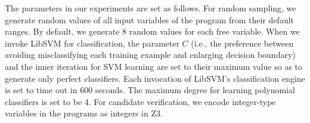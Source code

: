 The parameters in our experiments are set as follows. For random sampling, we generate random values of all input variables of the program from their default ranges. By default, we generate 8 random values for each free variable.
When we invoke LibSVM for classification, the parameter $C$ (i.e., the preference between avoiding misclassifying each training example and enlarging decision boundary) and the inner iteration for SVM learning are set to their maximum value so as to generate only perfect classifiers.
Each invocation of LibSVM's classification engine is set to time out in 600 seconds.
The maximum degree for learning polynomial classifiers is set to be 4. For candidate verification, we encode integer-type variables in the programs as integers in Z3.

%
%

